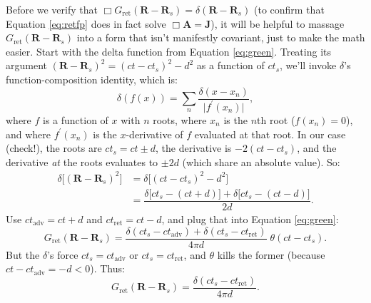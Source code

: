 \documentclass[12pt]{article}
\renewcommand{\vv}[1]{\mathbf{#1}}
\begin{document}
Before we verify that $\Box G_{\textrm{ret}}( \vv R - \vv R_{s} ) = \delta ( \vv R - \vv R_{s} )$ (to confirm that Equation \ref{eq:retfp} does in fact solve $\Box \vv A = \vv J$), it will be helpful to massage $G_{\textrm{ret}}( \vv R - \vv R_{s} )$ into a form that isn't manifestly covariant, just to make the math easier. Start with the delta function from Equation \ref{eq:green}. Treating its argument $(\vv R - \vv R_{s})^2 = (ct - ct_{s})^2 - d^2$ as a function of $ct_{s}$, we'll invoke $\delta$'s function-composition identity, which is:
\begin{equation}\label{eq:deltacomp}
\delta (f(x)) = \sum_{n} \dfrac{\delta(x - x_n)}{\vert f ^\prime (x_n) \vert} ,
\end{equation}
where $f$ is a function of $x$ with $n$ roots, where $x_n$ is the $n$th root ($f(x_n) = 0$), and where $f^\prime (x_n)$ is the $x$-derivative of $f$ evaluated at that root. In our case (check!), the roots are $ct_s = ct \pm d$, the derivative is $-2 (ct - ct_{s})$, and the derivative \emph{at} the roots evaluates to $\pm 2 d$ (which share an absolute value). So:
\begin{equation*}
\begin{aligned}
\delta \big[ (\vv R - \vv R_{s})^2 \big] &= \delta \big[ (ct - ct_{s})^2 - d^2 \big] \\[4pt]
&= \dfrac{\delta \big[ ct_{s} - (ct + d) \big] + \delta \big[ ct_{s} - (ct - d) \big]}{2 d} .
\end{aligned}
\end{equation*}
Use $ct_{\textrm{adv}} = ct + d$ and $ct_{\textrm{ret}} = ct - d$, and plug that into Equation \ref{eq:green}:
\begin{equation*}
G_{\textrm{ret}} (\vv R - \vv R_{s}) = \dfrac{\delta ( ct_{s} - ct_{\textrm{adv}} ) + \delta ( ct_{s} - ct_{\textrm{ret}} )}{4 \pi d} \; \theta ( ct - ct_{s} ) .
\end{equation*}
But the $\delta$'s force $ct_{s} = ct_{\textrm{adv}}$ or $ct_{s} = ct_{\textrm{ret}}$, and $\theta$ kills the former (because ${ct - ct_{\textrm{adv}} = -d < 0}$). Thus:
\begin{equation}\label{eq:green2}
G_{\textrm{ret}} (\vv R - \vv R_{s}) = \dfrac{\delta ( ct_{s} - ct_{\textrm{ret}} )}{4 \pi d} .
\end{equation}
\end{document}
